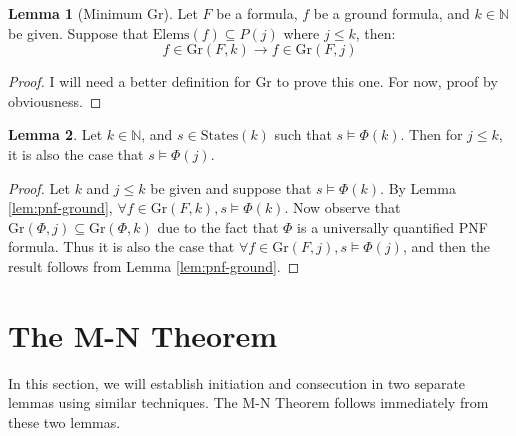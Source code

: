 \documentclass[12pt]{article}
\theoremstyle{definition}
\newtheorem{lemma}{Lemma}
\theoremstyle{remark}
\newcommand{\states}{\text{States}}
\newcommand{\gr}{\text{Gr}}
\newcommand{\elems}{\text{Elems}}
\begin{document}
\begin{lemma}[Minimum Gr]
  \label{lem:min-gr}
  Let $F$ be a formula, $f$ be a ground formula, and $k \in \mathbb{N}$ be given.  Suppose that $\elems(f) \subseteq P(j)$ where $j \leq k$, then:
  $$f \in \gr(F,k) \rightarrow f \in \gr(F,j)$$
\end{lemma}
\begin{proof}
  I will need a better definition for $\gr$ to prove this one.  For now, proof by obviousness.
\end{proof}

\begin{lemma}
  \label{lem:lt-sat}
  Let $k \in \mathbb{N}$, and $s \in \states(k)$ such that $s \models \Phi(k)$.  Then for $j \leq k$, it is also the case that $s \models \Phi(j)$.
\end{lemma}
\begin{proof}
  Let $k$ and $j \leq k$ be given and suppose that $s \models \Phi(k)$.  By Lemma \ref{lem:pnf-ground}, $\forall f \in \gr(F,k), s \models \Phi(k)$.  Now observe that $\gr(\Phi,j) \subseteq \gr(\Phi,k)$ due to the fact that $\Phi$ is a universally quantified PNF formula.  Thus it is also the case that $\forall f \in \gr(F,j), s \models \Phi(j)$, and then the result follows from Lemma \ref{lem:pnf-ground}.
\end{proof}



\section{The M-N Theorem}

In this section, we will establish initiation and consecution in two separate lemmas using similar techniques.  The M-N Theorem follows immediately from these two lemmas.
\end{document}
